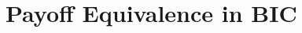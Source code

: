 \documentclass[english,10pt
,aspectratio=169
]{beamer}
\begin{document}

\section{Payoff Equivalence in BIC}

\end{document}
